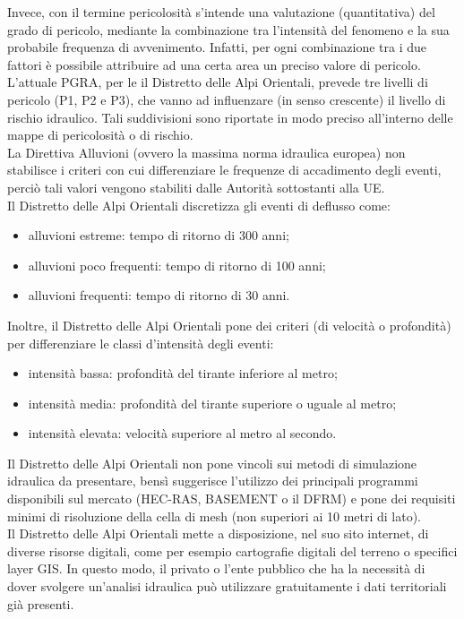 Invece, con il termine pericolosità s'intende una valutazione (quantitativa) del grado di pericolo, mediante la combinazione tra l'intensità del fenomeno e la sua probabile frequenza di avvenimento. Infatti, per ogni combinazione tra i due fattori è possibile attribuire ad una certa area un preciso valore di pericolo.\\
L'attuale PGRA, per le il Distretto delle Alpi Orientali, prevede tre livelli di pericolo (P1, P2 e P3), che vanno ad influenzare (in senso crescente) il livello di rischio idraulico. Tali suddivisioni sono riportate in modo preciso all'interno delle mappe di pericolosità o di rischio.\\
La Direttiva Alluvioni (ovvero la massima norma idraulica europea) non stabilisce i criteri con cui differenziare le frequenze di accadimento degli eventi, perciò tali valori vengono stabiliti dalle Autorità sottostanti alla UE.\\
Il Distretto delle Alpi Orientali discretizza gli eventi di deflusso come:
\begin{itemize}
    \item alluvioni estreme: tempo di ritorno di 300 anni;
    \item alluvioni poco frequenti: tempo di ritorno di 100 anni;
    \item alluvioni frequenti: tempo di ritorno di 30 anni.
\end{itemize}
Inoltre, il Distretto delle Alpi Orientali pone dei criteri (di velocità o profondità) per differenziare le classi d'intensità degli eventi:
\begin{itemize}
    \item intensità bassa: profondità del tirante inferiore al metro;
    \item intensità media: profondità del tirante superiore o uguale al metro;
    \item intensità elevata: velocità superiore al metro al secondo.
\end{itemize}

Il Distretto delle Alpi Orientali non pone vincoli sui metodi di simulazione idraulica da presentare, bensì suggerisce l'utilizzo dei principali programmi disponibili sul mercato (HEC-RAS, BASEMENT o il DFRM) e pone dei requisiti minimi di risoluzione della cella di mesh (non superiori ai 10 metri di lato).\\
Il Distretto delle Alpi Orientali mette a disposizione, nel suo sito internet, di diverse risorse digitali, come per esempio cartografie digitali del terreno o specifici layer GIS. In questo modo, il privato o l'ente pubblico che ha la necessità di dover svolgere un'analisi idraulica può utilizzare gratuitamente i dati territoriali già presenti.

